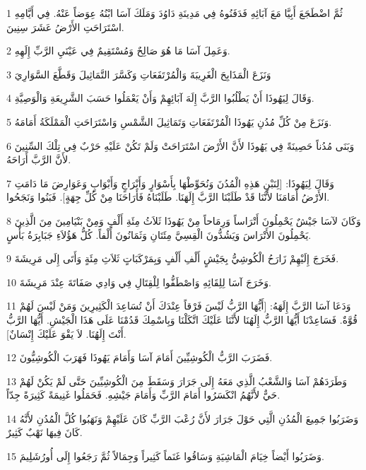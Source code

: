 \par 1 ثُمَّ اضْطَجَعَ أَبِيَّا مَعَ آبَائِهِ فَدَفَنُوهُ فِي مَدِينَةِ دَاوُدَ وَمَلَكَ آسَا ابْنُهُ عِوَضاً عَنْهُ. فِي أَيَّامِهِ اسْتَرَاحَتِ الأَرْضُ عَشَرَ سِنِينَ.
\par 2 وَعَمِلَ آسَا مَا هُوَ صَالِحٌ وَمُسْتَقِيمٌ فِي عَيْنَيِ الرَّبِّ إِلَهِهِ.
\par 3 وَنَزَعَ الْمَذَابِحَ الْغَرِيبَةَ وَالْمُرْتَفَعَاتِ وَكَسَّرَ التَّمَاثِيلَ وَقَطَّعَ السَّوَارِيَ
\par 4 وَقَالَ لِيَهُوذَا أَنْ يَطْلُبُوا الرَّبَّ إِلَهَ آبَائِهِمْ وَأَنْ يَعْمَلُوا حَسَبَ الشَّرِيعَةِ وَالْوَصِيَّةِ.
\par 5 وَنَزَعَ مِنْ كُلِّ مُدُنِ يَهُوذَا الْمُرْتَفَعَاتِ وَتَمَاثِيلَ الشَّمْسِ وَاسْتَرَاحَتِ الْمَمْلَكَةُ أَمَامَهُ.
\par 6 وَبَنَى مُدُناً حَصِينَةً فِي يَهُوذَا لأَنَّ الأَرْضَ اسْتَرَاحَتْ وَلَمْ تَكُنْ عَلَيْهِ حَرْبٌ فِي تِلْكَ السِّنِينَ لأَنَّ الرَّبَّ أَرَاحَهُ.
\par 7 وَقَالَ لِيَهُوذَا: [لِنَبْنِ هَذِهِ الْمُدُنَ وَنُحَوِّطْهَا بِأَسْوَارٍ وَأَبْرَاجٍ وَأَبْوَابٍ وَعَوَارِضَ مَا دَامَتِ الأَرْضُ أَمَامَنَا لأَنَّنَا قَدْ طَلَبْنَا الرَّبَّ إِلَهَنَا. طَلَبْنَاهُ فَأَرَاحَنَا مِنْ كُلِّ جِهَةٍ]. فَبَنُوا وَنَجَحُوا.
\par 8 وَكَانَ لآسَا جَيْشٌ يَحْمِلُونَ أَتْرَاساً وَرِمَاحاً مِنْ يَهُوذَا ثَلاَثُ مِئَةِ أَلْفٍ وَمِنْ بَنْيَامِينَ مِنَ الَّذِينَ يَحْمِلُونَ الأَتْرَاسَ وَيَشُدُّونَ الْقِسِيَّ مِئَتَانِ وَثَمَانُونَ أَلْفاً. كُلُّ هَؤُلاَءِ جَبَابِرَةُ بَأْسٍ.
\par 9 فَخَرَجَ إِلَيْهِمْ زَارَحُ الْكُوشِيُّ بِجَيْشٍ أَلْفِ أَلْفٍ وَبِمَرْكَبَاتٍ ثَلاَثِ مِئَةٍ وَأَتَى إِلَى مَرِيشَةَ.
\par 10 وَخَرَجَ آسَا لِلِقَائِهِ وَاصْطَفُّوا لِلْقِتَالِ فِي وَادِي صَفَاتَةَ عِنْدَ مَرِيشَةَ.
\par 11 وَدَعَا آسَا الرَّبَّ إِلَهَهُ: [أَيُّهَا الرَّبُّ لَيْسَ فَرْقاً عِنْدَكَ أَنْ تُسَاعِدَ الْكَثِيرِينَ وَمَنْ لَيْسَ لَهُمْ قُوَّةٌ. فَسَاعِدْنَا أَيُّهَا الرَّبُّ إِلَهُنَا لأَنَّنَا عَلَيْكَ اتَّكَلْنَا وَبِاسْمِكَ قَدُمْنَا عَلَى هَذَا الْجَيْشِ. أَيُّهَا الرَّبُّ أَنْتَ إِلَهُنَا. لاَ يَقْوَ عَلَيْكَ إِنْسَانٌ].
\par 12 فَضَرَبَ الرَّبُّ الْكُوشِيِّينَ أَمَامَ آسَا وَأَمَامَ يَهُوذَا فَهَرَبَ الْكُوشِيُّونَ.
\par 13 وَطَرَدَهُمْ آسَا وَالشَّعْبُ الَّذِي مَعَهُ إِلَى جَرَارَ وَسَقَطَ مِنَ الْكُوشِيِّينَ حَتَّى لَمْ يَكُنْ لَهُمْ حَيٌّ لأَنَّهُمُ انْكَسَرُوا أَمَامَ الرَّبِّ وَأَمَامَ جَيْشِهِ. فَحَمَلُوا غَنِيمَةً كَثِيرَةً جِدّاً.
\par 14 وَضَرَبُوا جَمِيعَ الْمُدُنِ الَّتِي حَوْلَ جَرَارَ لأَنَّ رُعْبَ الرَّبِّ كَانَ عَلَيْهِمْ وَنَهَبُوا كُلَّ الْمُدُنِ لأَنَّهُ كَانَ فِيهَا نَهْبٌ كَثِيرٌ.
\par 15 وَضَرَبُوا أَيْضاً خِيَامَ الْمَاشِيَةِ وَسَاقُوا غَنَماً كَثِيراً وَجِمَالاً ثُمَّ رَجَعُوا إِلَى أُورُشَلِيمَ.


